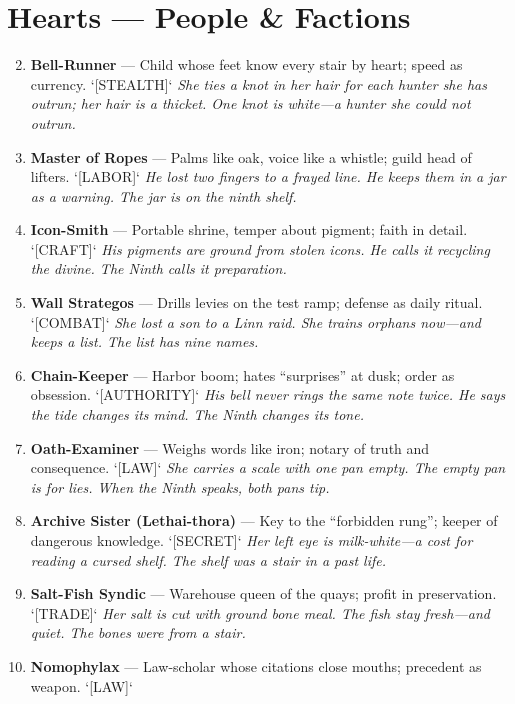 \section*{Hearts --- People \& Factions}
\label{sec:thepyrgos-people}
\begin{enumerate}
\setcounter{enumi}{1}
\item \textbf{Bell-Runner} --- Child whose feet know every stair by heart; speed as currency. `[STEALTH]`
  \hfill \textit{She ties a knot in her hair for each hunter she has outrun; her hair is a thicket. One knot is white---a hunter she could not outrun.}
\item \textbf{Master of Ropes} --- Palms like oak, voice like a whistle; guild head of lifters. `[LABOR]`
  \hfill \textit{He lost two fingers to a frayed line. He keeps them in a jar as a warning. The jar is on the ninth shelf.}
\item \textbf{Icon-Smith} --- Portable shrine, temper about pigment; faith in detail. `[CRAFT]`
  \hfill \textit{His pigments are ground from stolen icons. He calls it recycling the divine. The Ninth calls it preparation.}
\item \textbf{Wall Strategos} --- Drills levies on the test ramp; defense as daily ritual. `[COMBAT]`
  \hfill \textit{She lost a son to a Linn raid. She trains orphans now---and keeps a list. The list has nine names.}
\item \textbf{Chain-Keeper} --- Harbor boom; hates ``surprises'' at dusk; order as obsession. `[AUTHORITY]`
  \hfill \textit{His bell never rings the same note twice. He says the tide changes its mind. The Ninth changes its tone.}
\item \textbf{Oath-Examiner} --- Weighs words like iron; notary of truth and consequence. `[LAW]`
  \hfill \textit{She carries a scale with one pan empty. The empty pan is for lies. When the Ninth speaks, both pans tip.}
\item \textbf{Archive Sister (Lethai-thora)} --- Key to the ``forbidden rung''; keeper of dangerous knowledge. `[SECRET]`
  \hfill \textit{Her left eye is milk-white---a cost for reading a cursed shelf. The shelf was a stair in a past life.}
\item \textbf{Salt-Fish Syndic} --- Warehouse queen of the quays; profit in preservation. `[TRADE]`
  \hfill \textit{Her salt is cut with ground bone meal. The fish stay fresh---and quiet. The bones were from a stair.}
\item \textbf{Nomophylax} --- Law-scholar whose citations close mouths; precedent as weapon. `[LAW]`

\end{enumerate}
